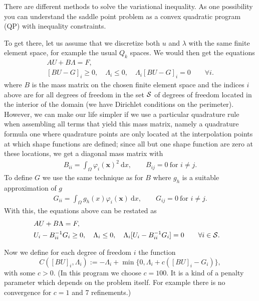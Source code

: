 \documentclass{article}
\begin{document}
There are different methods to solve the variational inequality. As one
possibility you can understand the saddle point problem as a convex quadratic program (QP) with
inequality constraints.

To get there, let us assume that we discretize both $u$ and $\lambda$ with the
same finite element space, for example the usual $Q_k$ spaces. We would then
get the equations
\begin{eqnarray*}
 &A U + B\Lambda = F,&\\
 &[BU-G]_i \geq 0, \quad \Lambda_i \leq 0,\quad \Lambda_i[BU-G]_i = 0
\qquad \forall i.&
\end{eqnarray*}
where $B$ is the mass matrix on the chosen finite element space and the
indices $i$ above are for all degrees of freedom in the set $\cal S$ of degrees of
freedom located in the interior of the domain
(we have Dirichlet conditions on the perimeter). However, we
can make our life simpler if we use a particular quadrature rule when
assembling all terms that yield this mass matrix, namely a quadrature formula
one where quadrature points are only located at the interpolation points at
which shape functions are defined; since all but one shape function are zero
at these locations, we get a diagonal mass matrix with
\begin{align*}
  B_{ii} = \int_\Omega \varphi_i(\mathbf x)^2\ \textrm{d}x,
  \qquad
  B_{ij}=0 \ \text{for } i\neq j.
\end{align*}
To define $G$ we use the same technique as for $B$ where $g_h$ is a
suitable approximation of $g$
\begin{align*}
  G_{ii} = \int_\Omega g_h(x) \varphi_i(\mathbf x)\ \textrm{d}x,
  \qquad
  G_{ij}=0 \ \text{for } i\neq j.
\end{align*}
With this, the equations above can be restated as
\begin{eqnarray*}
 &A U + B\Lambda = F,&\\
 &U_i-B_{ii}^{-1}G_i \ge 0, \quad \Lambda_i \leq 0,\quad \Lambda_i[U_i-B_{ii}^{-1}G_i] = 0
\qquad \forall i\in{\cal S}.&
\end{eqnarray*}

Now we define for each degree of freedom $i$ the function
\begin{equation*}
 C([BU]_i,\Lambda_i):=-\Lambda_i + \min\lbrace 0, \Lambda_i + c([BU]_i - G_i) \rbrace,
\end{equation*}
with some $c>0$. (In this program we choose $c = 100$. It is a kind of a penalty parameter which
depends on the problem itself. For example there is no convergence for $c = 1$ and 7 refinements.)
\end{document}
